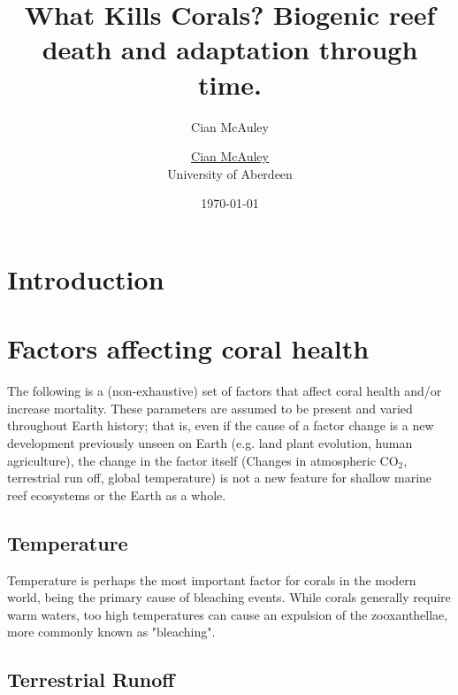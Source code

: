 \documentclass[11pt,a4paper]{article}
\author{Cian McAuley}
\title{What Kills Corals?}
\begin{document}
\begin{center}

\title{
\huge Biogenic reef death and adaptation through time. 
}
\author{\Large \href{mailto:r02cm21@abdn.ac.uk}{Cian McAuley} 
\\University of Aberdeen
}
\date{\today}

\maketitle


\end{center}
\begin{abstract}

\end{abstract}

\section{Introduction}

\section{Factors affecting coral health}


The following is a (non-exhaustive) set of factors that affect coral health and/or increase mortality. These parameters are assumed to be present and varied throughout Earth history; that is, even if the cause of a factor change is a new development previously unseen on Earth (e.g. land plant evolution, human agriculture), the change in the factor itself (Changes in atmospheric CO$_{2}$, terrestrial run off, global temperature) is not a new feature for shallow marine reef ecosystems or the Earth as a whole.

\subsection{Temperature}
Temperature is perhaps the most important factor for corals in the modern world, being the primary cause of bleaching events. While corals generally require warm waters, too high temperatures can cause an expulsion of the zooxanthellae, more commonly known as "bleaching".


\subsection{Terrestrial Runoff}
\end{document}
